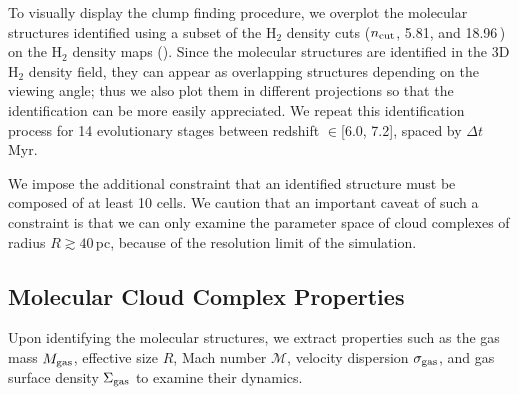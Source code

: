 \IfFileExists{emulateapjlegacy.cls}{\documentclass[iop]{emulateapjlegacy}}{\documentclass[iop]{emulateapj}}
\begin{document}
To visually display the clump finding procedure, we overplot the molecular structures identified using a subset of the H$_2$ density cuts ($n_{\rm cut}$, 5.81, and 18.96\,\cc) on the H$_2$ density maps (). Since the molecular structures are identified in the 3D H$_2$ density field, they can appear as overlapping structures depending on the viewing angle; thus we also plot them in different projections so that the identification can be more easily appreciated.
%
We repeat this identification process for 14 evolutionary stages between redshift \z$\in$[6.0, 7.2], spaced by $\Delta t$\,Myr.

We impose the additional constraint that an identified structure must be composed of at least 10 cells. We caution that an important caveat of such a constraint is that we can only examine the parameter space of cloud complexes of radius $R\gtrsim 40$\,pc, because of the resolution limit of the simulation.

\subsection{Molecular Cloud Complex Properties} \label{sec:distribution}

Upon identifying the molecular structures, we extract properties such as the gas mass $M_{\rm gas}$, effective size $R$, Mach number
$\mathcal{M}$, velocity dispersion $\sigma_{\rm gas}$, and gas surface density $\Sigma_{\rm gas}$ to examine their dynamics.
\end{document}
